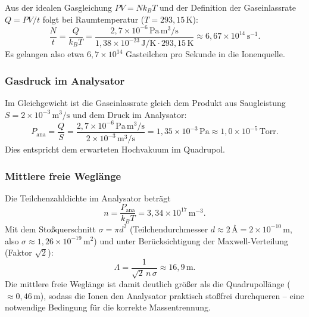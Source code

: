 \documentclass{article}
\begin{document}
Aus der idealen Gasgleichung $PV = N k_B T$ und der Definition der
Gaseinlassrate $Q = PV/t$ folgt bei Raumtemperatur
($T = 293{,}15\,\mathrm{K}$):
\begin{equation}
    \frac{N}{t} = \frac{Q}{k_B T}
    = \frac{2{,}7 \times 10^{-6}\,\mathrm{Pa\,m^3/s}}
           {1{,}38 \times 10^{-23}\,\mathrm{J/K} \cdot 293{,}15\,\mathrm{K}}
    \approx 6{,}67 \times 10^{14}\,\mathrm{s^{-1}}.
\end{equation}
Es gelangen also etwa $6{,}7 \times 10^{14}$ Gasteilchen pro Sekunde in
die Ionenquelle.

\subsubsection*{Gasdruck im Analysator}

Im Gleichgewicht ist die Gaseinlassrate gleich dem Produkt aus
Saugleistung $S = 2 \times 10^{-3}\,\mathrm{m^3/s}$ und dem Druck im
Analysator:
\begin{equation}
    P_{\mathrm{ana}} = \frac{Q}{S}
    = \frac{2{,}7 \times 10^{-6}\,\mathrm{Pa\,m^3/s}}
           {2 \times 10^{-3}\,\mathrm{m^3/s}}
    = 1{,}35 \times 10^{-3}\,\mathrm{Pa}
    \approx 1{,}0 \times 10^{-5}\,\mathrm{Torr}.
\end{equation}
Dies entspricht dem erwarteten Hochvakuum im Quadrupol.

\subsubsection*{Mittlere freie Weglänge}

Die Teilchenzahldichte im Analysator beträgt
\begin{equation}
    n = \frac{P_{\mathrm{ana}}}{k_B T}
    = 3{,}34 \times 10^{17}\,\mathrm{m^{-3}}.
\end{equation}
Mit dem Stoßquerschnitt $\sigma = \pi d^2$ (Teilchendurchmesser
$d \approx 2\,\text{\AA} = 2 \times 10^{-10}\,\mathrm{m}$,
also $\sigma \approx 1{,}26 \times 10^{-19}\,\mathrm{m^2}$) und unter
Berücksichtigung der Maxwell-Verteilung (Faktor $\sqrt{2}$):
\begin{equation}
    \Lambda = \frac{1}{\sqrt{2}\,n\,\sigma}
    \approx 16{,}9\,\mathrm{m}.
\end{equation}
Die mittlere freie Weglänge ist damit deutlich größer als die
Quadrupollänge ($\approx 0{,}46\,\mathrm{m}$), sodass die Ionen den
Analysator praktisch stoßfrei durchqueren -- eine notwendige Bedingung
für die korrekte Massentrennung.
\end{document}
